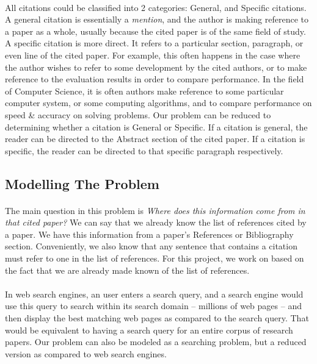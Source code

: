 \documentclass[12 pt]{article}
\begin{document}
\paragraph{}
All citations could be classified into 2 categories: General, and Specific citations. A general citation is essentially a \textit{mention}, and the author is making reference to a paper as a whole, usually because the cited paper is of the same field of study. A specific citation is more direct. It refers to a particular section, paragraph, or even line of the cited paper. For example, this often happens in the case where the author wishes to refer to some development by the cited authors, or to make reference to the evaluation results in order to compare performance. In the field of Computer Science, it is often authors make reference to some particular computer system, or some computing algorithms, and to compare performance on speed \& accuracy on solving problems. Our problem can be reduced to determining whether a citation is General or Specific. If a citation is general, the reader can be directed to the Abstract section of the cited paper. If a citation is specific, the reader can be directed to that specific paragraph respectively.

\subsection{Modelling The Problem}
\paragraph{}
The main question in this problem is \textit{Where does this information come from in that cited paper?}
We can say that we already know the list of references cited by a paper. We have this information from a paper's References or Bibliography section. Conveniently, we also know that any sentence that contains a citation must refer to one in the list of references. For this project, we work on based on the fact that we are already made known of the list of references.

\paragraph{}
In web search engines, an user enters a search query, and a search engine would use this query to search within its search domain -- millions of web pages -- and then display the best matching web pages as compared to the search query. That would be equivalent to having a search query for an entire corpus of research papers. Our problem can also be modeled as a searching problem, but a reduced version as compared to web search engines.
\end{document}
